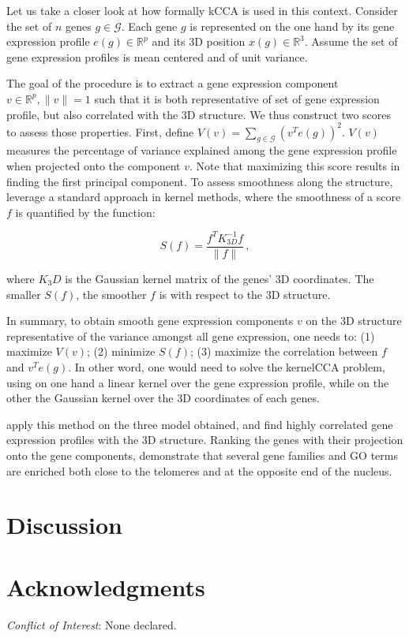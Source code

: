 \documentclass[letterpaper,12pt]{article}
\newcommand{\RR}{\mathbb{R}}
\begin{document}
Let us take a closer look at how formally kCCA is used in this context.
Consider the set of $n$ genes $g \in \mathcal{G}$. Each gene $g$ is
represented on the one hand by its gene expression profile $e(g) \in \RR^{p}$
and its 3D position $x(g) \in \RR^3$. Assume the set of gene expression
profiles is mean centered and of unit variance.

The goal of the procedure is to extract a gene expression component $v\in
\RR^p, \|v\|=1$ such that it is both representative of set of gene expression profile,
but also correlated with the 3D structure. We thus construct two scores to
assess those properties. First, define $V(v) = \underset{g \in
\mathcal{G}}{\sum} (v^T e(g))^2$. $V(v)$ measures the percentage of variance
explained among the gene expression profile when projected onto the component
$v$. Note that maximizing this score results in finding the first principal
component. To assess smoothness along the structure,
\citet{ay:three-dimensional} leverage a standard approach in kernel methods,
where the smoothness of a score $f$ is quantified by the function:

\begin{equation}
S(f) = \frac{f^TK^{-1}_{3D}f}{\|f\|}\,,
\end{equation}

where $K_3D$ is the Gaussian kernel matrix of the genes' 3D coordinates. The
smaller $S(f)$, the smoother $f$ is with respect to the 3D structure.

In summary, to obtain smooth gene expression components $v$ on the 3D
structure representative of the variance amongst all gene expression, one
needs to: (1) maximize $V(v)$; (2) minimize $S(f)$; (3) maximize the
correlation between $f$ and $v^T e(g)$. In other word, one would need to solve
the kernelCCA problem, using on one hand a linear kernel over the gene
expression profile, while on the other the Gaussian kernel over the 3D
coordinates of each genes.

\citet{ay:three-dimensional} apply this method on the three model obtained,
and find highly correlated gene expression profiles with the 3D structure.
Ranking the genes with their projection onto the gene components,
\citet{ay:three-dimensional} demonstrate that several gene families and GO
terms are enriched both close to the telomeres and at the opposite end of the
nucleus.



\section*{Discussion}

\section*{Acknowledgments}



{\it Conflict of Interest}: None declared.




\end{document}
